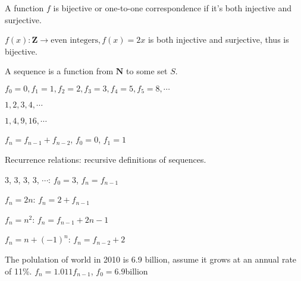 \begin{defn}
A function $f$ is bijective or one-to-one correspondence if it's both injective and surjective.
\end{defn}

\begin{ex}
$f(x): \mathbf{Z} \rightarrow \text{even integers}, f(x) = 2x$ is both injective and surjective, thus is bijective.
\end{ex}

\begin{defn}
A sequence is a function from $\mathbf{N}$ to some set $S$.
\end{defn}

\begin{ex}
$f_0 = 0, f_1 = 1, f_2 = 2, f_3 = 3, f_4 = 5, f_5 = 8, \cdots$
\end{ex}

\begin{ex}
$1, 2, 3, 4, \cdots$
\end{ex}

\begin{ex}
$1, 4, 9, 16, \cdots$
\end{ex}

\begin{ex}
$f_n = f_{n - 1} + f_{n - 2}$, $f_0 = 0$, $f_1 = 1$
\end{ex}

\begin{remark}
Recurrence relations: recursive definitions of sequences.
\end{remark}

\begin{ex}
3, 3, 3, 3, $\cdots$: $f_0 = 3$, $f_n = f_{n - 1}$
\end{ex}

\begin{ex}
$f_n = 2n$: $f_n = 2 + f_{n - 1}$
\end{ex}

\begin{ex}
$f_n = n^2$: $f_n = f_{n - 1} + 2n - 1$
\end{ex}

\begin{ex}
$f_n = n + (-1)^n$: $f_n = f_{n - 2} + 2$
\end{ex}

\begin{ex}
The polulation of world in 2010 is 6.9 billion, assume it grows at an annual rate of 11\%.
$f_n = 1.011 f_{n - 1}$, $f_0 = 6.9$billion
\end{ex}

